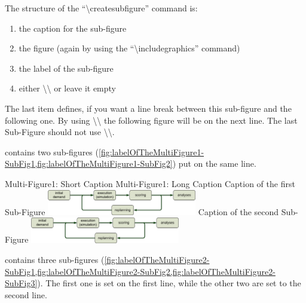 The structure of the ``\textbackslash{}createsubfigure'' command is:
\begin{enumerate}
  \item\label{item:multFig1} the caption for the sub-figure
  \item\label{item:multFig2} the figure (again by using the
``\textbackslash{}includegraphics'' command)
  \item\label{item:multFig3} the label of the sub-figure
  \item\label{item:multFig4} either \textbackslash{}\textbackslash{} or leave it
empty
\end{enumerate}
The last item defines, if you want a line break between this
sub-figure and the following one. By using \textbackslash{}\textbackslash{} the
following figure will be on the next line. The last Sub-Figure should
not use \textbackslash{}\textbackslash{}.

 contains two sub-figures
(\cref{fig:labelOfTheMultiFigure1-SubFig1,fig:labelOfTheMultiFigure1-SubFig2}) put on the same
line.

\createfigure%
{Multi-Figure1: Short Caption}%
{Multi-Figure1: Long Caption}%
{\label{fig:labelOfTheMultiFigure1}}%
{%
  \createsubfigure%
  {Caption of the first Sub-Figure}%
  {\includegraphics[width=0.49\textwidth,
angle=0]{figures/MATSimLoop}}%
  {\label{fig:labelOfTheMultiFigure1-SubFig1}}%
  {}%
  \createsubfigure%
  {Caption of the second Sub-Figure}%
  {\includegraphics[width=0.49\textwidth,
angle=0]{figures/MATSimLoop}}%
  {\label{fig:labelOfTheMultiFigure1-SubFig2}}%
  {}%
}%
{}

 contains three sub-figures
(\cref{fig:labelOfTheMultiFigure2-SubFig1,fig:labelOfTheMultiFigure2-SubFig2,fig:labelOfTheMultiFigure2-SubFig3}). The first one is set
on the first line, while the other two are set to the second line.

